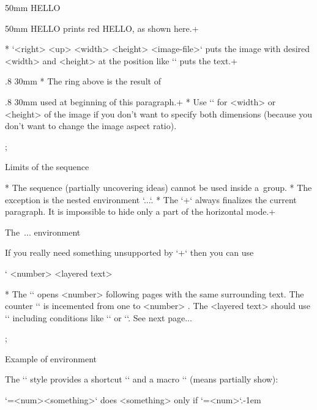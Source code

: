 \begtt
\puttext 0mm 50mm {\Red HELLO}
\endtt

  \puttext 0mm 50mm {\Red HELLO}
  prints red HELLO, as shown here.\pg+

* `\putpic <right> <up> <width> <height> {<image-file>}`
  puts the image with desired <width> and <height> at the position like
  `\puttext` puts the text.\pg+

  \putpic .8\hsize 20mm 30mm 
* The ring above is the result of

\begtt
\putpic .8\hsize 20mm 30mm 
\endtt
  used at beginning of this paragraph.\pg+
* Use `\nospec` for <width> or <height> of the image if you don't want to specify both
  dimensions (because you don't want to change the image aspect ratio).

\pg; %

\sec Limits of the \code{\\pg+} sequence

* The \code{\\pg+} sequence (partially uncovering ideas) cannot be used inside
  a~group.
* The exception is the nested environment `\begitems...\enditems`.
* The `\pg+` always finalizes the current paragraph.
  It is impossible to hide only a part of the horizontal mode.\pg+

\sec The \code{\\layers}\,...\code{\\endlayers} environment

If you really need something unsupported by `\pg+` then you can use

\begtt \catcode`
\layers <number>
<layered text>
\endlayers
\endtt

* The `\layers` opens <number> following pages with the same
  surrounding text. The counter `\layernum` is incemented from one to
  <number> . The <layered text> should use `\layernum` including
  conditions like `\ifnum\layernum` or `\ifcase\layernum`.
  See next page...

\pg; %

\sec Example of \code{\\layers} environment

The `\slides` style provides a shortcut `\use` and a macro `\pshow` (means
partially show):

\begtt
\def\use#1#2{\ifnum\layernum#1\relax#2\fi}
\def\pshow#1{\use{=#1}\Red \use{<#1}\Transparent \ignorespaces}
\endtt
`\use{=<num>}{<something>}` does <something> only if `\layernum=<num>`.\kern-1em

